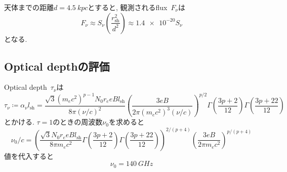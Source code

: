 \documentclass{ltjsarticle}
\newcommand{\rsh}{r_\mathrm{sh}}
\newcommand{\lsh}{l_\mathrm{sh}}
\begin{document}
天体までの距離\( d = \SI{4.5}{kpc} \)とすると, 観測されるflux~$F_\nu$は
\begin{equation}
  F_\nu
  \approx S_\nu\left( \frac{\rsh^2}{d^2} \right)
  \approx \num{1.4e-20}S_\nu
\end{equation}
となる.

\subsection{Optical depthの評価}
Optical depth~$\tau_\nu$は
\begin{equation}
  \tau_\nu \coloneqq \alpha_\nu \lsh
  =
  \frac{\sqrt{3} (m_e c^2)^{p-1} N_0 r_e eB \lsh}{8\pi (\nu/c)^2}
    \left( \frac{3eB}{2\pi(m_e c^2)^3(\nu/c)} \right)^{p/2}
    \Gamma\left( \frac{3p+2}{12} \right)
    \Gamma\left( \frac{3p+22}{12} \right)
\end{equation}
とかける. \( \tau = 1 \)のときの周波数$\nu_0$を求めると
\begin{equation}
  \nu_0/c
  =
  \left( 
    \frac{\sqrt{3}N_0 r_e eB \lsh}{8\pi m_e c^2}
    \Gamma\left( \frac{3p+2}{12} \right)
    \Gamma\left( \frac{3p+22}{12} \right)
  \right)^{2/(p+4)}
  \left( \frac{3eB}{2\pi m_e c^2} \right)^{p/(p+4)}
\end{equation}
値を代入すると
\begin{equation}
  \nu_0 = \SI{140}{GHz}
\end{equation}
\end{document}
